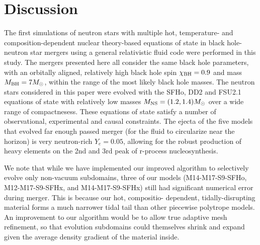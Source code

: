 %	
%
%	
%
%	


\section{Discussion}

The first simulations of neutron stars with multiple hot, temperature- and composition-dependent nuclear theory-based equations of state in black hole-neutron star mergers using a general relativistic fluid code were performed in this study.  
The mergers presented here all consider the same black hole parameters, with an orbitally aligned, relatively high black hole spin $\chi_{\rm BH} = 0.9$ and  mass $M_{\rm BH} = 7 M_\odot$, within the range of the most likely black hole masses.  
The neutron stars considered in this paper were evolved with the SFHo, DD2 and FSU2.1 equations of state with relatively low masses $M_{\rm NS} = (1.2,1.4) M_\odot$ over a wide range of compactnesess.  
These equations of state satisfy a number of observational, experimental and causal constraints.  
The ejecta of the five models that evolved far enough passed merger (for the fluid to circularize near the horizon) is very neutron-rich $Y_e = 0.05$, allowing for the robust production of heavy elements on the 2nd and 3rd peak of r-process nucleosynthesis.

We note that while we have implemented our improved algorithm to selectively evolve only non-vacuum subdomains, three of our models (M14-M17-S9-SFHo, M12-M17-S9-SFHx, and M14-M17-S9-SFHx) still had significant numerical error during merger. 
This is because our hot, compositio- dependent, tidally-disrupting material forms a much narrower tidal tail than other piecewise polytrope models.
An improvement to our algorithm would be to allow true adaptive mesh refinement, so that evolution subdomains could themselves shrink and expand given the average density gradient of the material inside.

